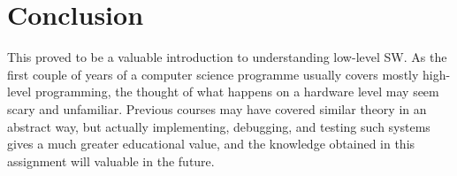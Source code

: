 \section{Conclusion}

This proved to be a valuable introduction to understanding low-level SW. As the first couple of years of a computer science programme usually covers mostly high-level programming, the thought of what happens on a hardware level may seem scary and unfamiliar. Previous courses may have covered similar theory in an abstract way, but actually implementing, debugging, and testing such systems gives a much greater educational value, and the knowledge obtained in this assignment will valuable in the future.